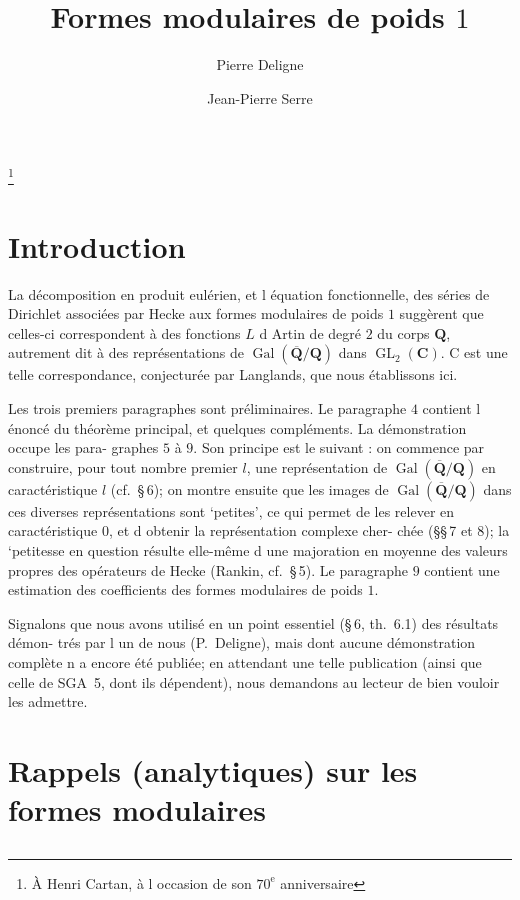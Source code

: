 \documentclass[11pt]{amsart}
\theoremstyle{plain}
\theoremstyle{definition}
\theoremstyle{remark}
\DeclareMathOperator{\Gal}{Gal}
\DeclareMathOperator{\GL}{GL}
\newcommand{\Q}{\mathbf{Q}}
\newcommand{\C}{\mathbf{C}}
\begin{document}
\title{Formes modulaires de poids $1$}
\author{Pierre Deligne}
\author{Jean-Pierre Serre}
\thanks{À Henri Cartan, à l occasion de son $70^{\mathrm{e}}$ anniversaire}
\maketitle

\section*{Introduction}
La décomposition en produit eulérien, et l équation fonctionnelle, des séries de
Dirichlet associées par Hecke aux formes modulaires de poids $1$ suggèrent que celles-ci
correspondent à des fonctions $L$ d Artin de degré $2$ du corps $\Q$, autrement dit à des représentations
de $\Gal(\overline{\Q}/\Q)$ dans $\GL_2(\C)$. C est une telle correspondance, conjecturée par
Langlands, que nous établissons ici.

Les trois premiers paragraphes sont préliminaires. Le paragraphe $4$ contient l énoncé
du théorème principal, et quelques compléments. La démonstration occupe les para-
graphes $5$ à $9$. Son principe est le suivant : on commence par construire, pour tout nombre
premier $l$, une représentation de $\Gal(\overline{\Q}/\Q)$ en caractéristique $l$ (cf.~\S\,6); on montre ensuite
que les images de $\Gal(\overline{\Q}/\Q)$ dans ces diverses représentations sont `petites', ce qui
permet de les relever en caractéristique $0$, et d obtenir la représentation complexe cher-
chée (\S\S\,7 et 8); la `petitesse en question résulte elle-même d une majoration en moyenne
des valeurs propres des opérateurs de Hecke (Rankin, cf.~\S\,5). Le paragraphe $9$ contient
une estimation des coefficients des formes modulaires de poids $1$.

Signalons que nous avons utilisé en un point essentiel (\S\,6, th.~6.1) des résultats démon-
trés par l un de nous (P.~Deligne), mais dont aucune démonstration complète n a encore
été publiée; en attendant une telle publication (ainsi que celle de SGA~5, dont ils dépendent),
nous demandons au lecteur de bien vouloir les admettre.

\section{Rappels (analytiques) sur les formes modulaires}

\subsection{}
\end{document}
